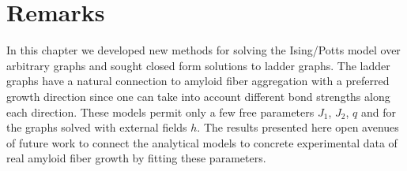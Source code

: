 \section{Remarks}
%
In this chapter we developed new methods for solving the Ising/Potts model over arbitrary graphs and sought closed form solutions to ladder graphs. The ladder graphs have a natural connection to amyloid fiber aggregation with a preferred growth direction since one can take into account different bond strengths along each direction. These models permit only a few free parameters $J_1$, $J_2$, $q$ and for the graphs solved with external fields $h$. The results presented here open avenues of future work to connect the analytical models to concrete experimental data of real amyloid fiber growth by fitting these parameters.

